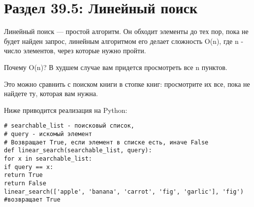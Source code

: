 \vspace{\baselineskip}
\section*{Раздел 39.5: Линейный поиск}

\vspace{\baselineskip}
Линейный поиск --- простой алгоритм. Он обходит элементы до тех пор, пока не будет найден запрос, линейным алгоритмом его делает сложность O(n), где n - число элементов, через которые нужно пройти. 

\vspace{\baselineskip}
Почему O(n)? В худшем случае вам придется просмотреть все n пунктов.

\vspace{\baselineskip}
Это можно сравнить с поиском книги в стопке книг: просмотрите их все, пока не найдете ту, которая вам нужна.

\vspace{\baselineskip}
Ниже приводится реализация на Python:
\begin{verbatim} 
# searchable_list - поисковый список,
# query - искомый элемент
# Возвращает True, если элемент в списке есть, иначе False
def linear_search(searchable_list, query):
for x in searchable_list:
if query == x:
return True
return False
linear_search(['apple', 'banana', 'carrot', 'fig', 'garlic'], 'fig') #возвращает True
\end{verbatim}
